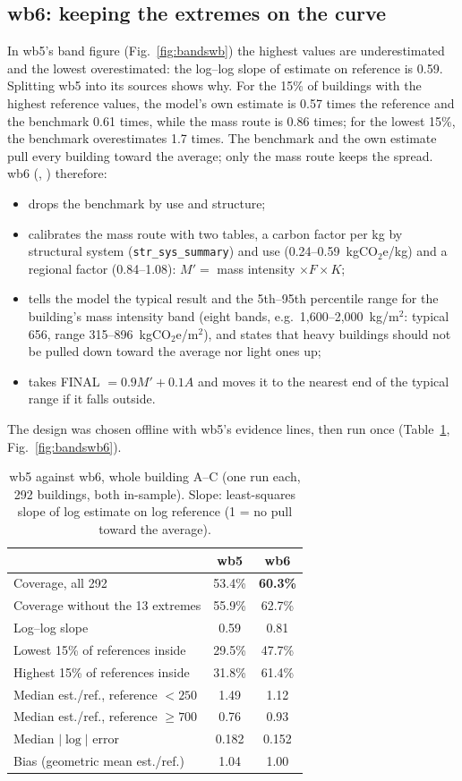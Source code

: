 \documentclass[10pt,letterpaper]{article}
\newcommand{\coe}{kgCO$_2$e/m$^2$}
\begin{document}
\subsection{wb6: keeping the extremes on the curve}
\label{sec:wb6}
In wb5's band figure (Fig.~\ref{fig:bandswb}) the highest values are underestimated and the lowest overestimated: the log--log slope of estimate on reference is 0.59. Splitting wb5 into its sources shows why. For the 15\% of buildings with the highest reference values, the model's own estimate is 0.57 times the reference and the benchmark 0.61 times, while the mass route is 0.86 times; for the lowest 15\%, the benchmark overestimates 1.7 times. The benchmark and the own estimate pull every building toward the average; only the mass route keeps the spread. wb6 (, ) therefore:
\begin{itemize}
\item drops the benchmark by use and structure;
\item calibrates the mass route with two tables, a carbon factor per kg by structural system (\texttt{str\_sys\_summary}) and use (0.24--0.59~kgCO$_2$e/kg) and a regional factor (0.84--1.08): $M'=$ mass intensity $\times F\times K$;
\item tells the model the typical result and the 5th--95th percentile range for the building's mass intensity band (eight bands, e.g.\ 1{,}600--2{,}000~kg/m$^2$: typical 656, range 315--896~\coe{}), and states that heavy buildings should not be pulled down toward the average nor light ones up;
\item takes FINAL $=0.9M'+0.1A$ and moves it to the nearest end of the typical range if it falls outside.
\end{itemize}
The design was chosen offline with wb5's evidence lines, then run once (Table~\ref{tab:wb6}, Fig.~\ref{fig:bandswb6}).

\begin{table}[t]
\centering\footnotesize
\caption{wb5 against wb6, whole building A--C (one run each, 292 buildings, both in-sample). Slope: least-squares slope of log estimate on log reference (1 = no pull toward the average).}
\label{tab:wb6}
\setlength{\tabcolsep}{4pt}
\begin{tabular}{lcc}
\toprule
 & wb5 & wb6 \\
\midrule
Coverage, all 292 & 53.4\% & \textbf{60.3\%} \\
Coverage without the 13 extremes & 55.9\% & 62.7\% \\
Log--log slope & 0.59 & 0.81 \\
Lowest 15\% of references inside & 29.5\% & 47.7\% \\
Highest 15\% of references inside & 31.8\% & 61.4\% \\
Median est./ref., reference $<250$ & 1.49 & 1.12 \\
Median est./ref., reference $\geq700$ & 0.76 & 0.93 \\
Median $|\log|$ error & 0.182 & 0.152 \\
Bias (geometric mean est./ref.) & 1.04 & 1.00 \\
\bottomrule
\end{tabular}
\end{table}
\end{document}
